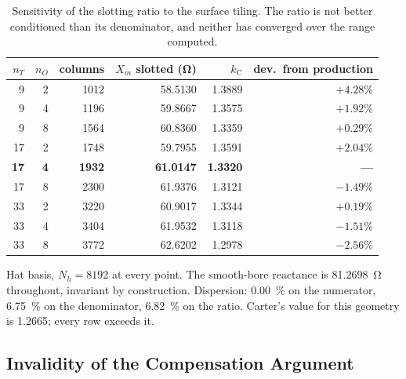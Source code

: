 \documentclass[10pt,a4paper,twocolumn]{article}
\theoremstyle{plain}
\theoremstyle{remark}
\begin{document}
\begin{table}[!tb]
\centering
\begin{threeparttable}
\footnotesize
\begin{tabular}{rrrrrr}
\toprule
$n_T$ & $n_O$ & columns & $X_m$ slotted (\si{\ohm})
      & $k_{\mathrm{C}}$ & dev.\ from production \\
\midrule
\num{9}  & \num{2} & \num{1012} & \num{58.5130} & \num{1.3889} & $+4.28\%$\\
\num{9}  & \num{4} & \num{1196} & \num{59.8667} & \num{1.3575} & $+1.92\%$\\
\num{9}  & \num{8} & \num{1564} & \num{60.8360} & \num{1.3359} & $+0.29\%$\\
\num{17} & \num{2} & \num{1748} & \num{59.7955} & \num{1.3591} & $+2.04\%$\\
\textbf{\num{17}} & \textbf{\num{4}} & \textbf{\num{1932}}
     & \textbf{\num{61.0147}} & \textbf{\num{1.3320}} & \textbf{---}\\
\num{17} & \num{8} & \num{2300} & \num{61.9376} & \num{1.3121} & $-1.49\%$\\
\num{33} & \num{2} & \num{3220} & \num{60.9017} & \num{1.3344} & $+0.19\%$\\
\num{33} & \num{4} & \num{3404} & \num{61.9532} & \num{1.3118} & $-1.51\%$\\
\num{33} & \num{8} & \num{3772} & \num{62.6202} & \num{1.2978} & $-2.56\%$\\
\bottomrule
\end{tabular}
\begin{tablenotes}[flushleft]\footnotesize
\item Hat basis, $N_h=\num{8192}$ at every point. The smooth-bore
reactance is \SI{81.2698}{\ohm} throughout, invariant by construction.
Dispersion: \SI{0.00}{\percent} on the numerator, \SI{6.75}{\percent} on
the denominator, \SI{6.82}{\percent} on the ratio. Carter's value for
this geometry is \num{1.2665}; every row exceeds it.
\end{tablenotes}
\end{threeparttable}
\caption{Sensitivity of the slotting ratio to the surface tiling. The
ratio is not better conditioned than its denominator, and neither has
converged over the range computed.}
\label{tab:tiling}
\end{table}

\subsection{Invalidity of the Compensation Argument}
\end{document}
